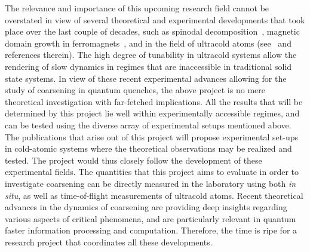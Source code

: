 \documentclass[a4paper,11pt,color]{article}
\begin{document}
\begin{enumerate}[label=(\alph*)]
The relevance and importance of this upcoming research field cannot be overstated in view of several theoretical and experimental developments that took place over the last couple of decades, such as spinodal decomposition~\cite{spinodal}, magnetic domain growth in ferromagnets~\cite{puri}, and in the field of ultracold atoms (see~\cite{ultracold, colrev, fermidyn,ncnsd2012} and references therein). The high degree of tunability in ultracold systems allow the rendering of slow dynamics in regimes that are inaccessible in traditional solid state systems. In view of these recent experimental advances allowing for the study of coarsening in quantum quenches, the above project is no mere theoretical investigation with far-fetched implications. All the results that will be determined by this project lie well within experimentally accessible regimes, and can be tested using the diverse array of experimental setups mentioned above. The publications that arise out of this project will propose experimental set-ups in 
cold-atomic systems where the theoretical observations may be
realized and tested. The project would thus closely follow the development of these experimental fields. The quantities that this project aims to evaluate in order to investigate coarsening can be directly measured in the laboratory using both \textit{in situ}, as well as time-of-flight measurements of ultracold atoms. Recent theoretical advances in the dynamics of coarsening are providing deep insights regarding various aspects of critical phenomena, and are particularly relevant in quantum faster information processing and computation. Therefore, the time is ripe for a research project that coordinates all these developments.


\end{enumerate}
\end{document}
